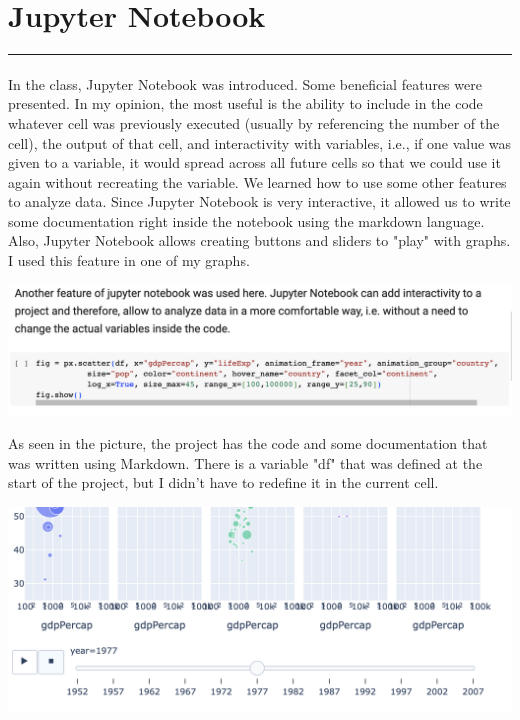 \documentclass[a4paper,11pt]{article}
\newcommand{\sectitle}[1]{
    \vspace{1.5ex}
    \section{#1}
    \vspace{-3ex}
    \noindent\rule{\textwidth}{0.7pt}
    \vspace{-4ex}
}
\begin{document}
\sectitle{Jupyter Notebook}

\paragraph{}
In the class, Jupyter Notebook was introduced. Some beneficial features were presented. In my opinion, the most useful is the ability to include in the code whatever cell was previously executed (usually by referencing the number of the cell), the output of that cell, and interactivity with variables, i.e., if one value was given to a variable, it would spread across all future cells so that we could use it again without recreating the variable. We learned how to use some other features to analyze data. Since Jupyter Notebook is very interactive, it allowed us to write some documentation right inside the notebook using the markdown language. Also, Jupyter Notebook allows creating buttons and sliders to "play" with graphs. I used this feature in one of my graphs. 

\begin{center}
\includegraphics[scale=0.52]{jup1.png}
\end{center}

As seen in the picture, the project has the code and some documentation that was written using Markdown. There is a variable "df" that was defined at the start of the project, but I didn't have to redefine it in the current cell. 

\begin{center}
\includegraphics[scale=0.52]{jup2.png}
\end{center}
\end{document}
